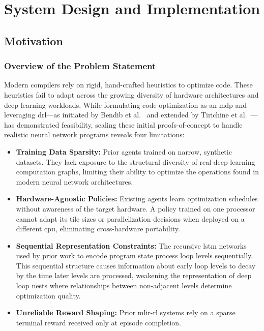 \chapter{System Design and Implementation}
\label{ch:design-implementation}

\section{Motivation}
\label{sec:problem-statement-contributions}

\subsection{Overview of the Problem Statement}
Modern compilers rely on rigid, hand-crafted heuristics to optimize code. These heuristics fail to adapt across the growing diversity of hardware architectures and deep learning workloads. While formulating code optimization as an \gls{mdp} and leveraging \gls{drl}---as initiated by Bendib et al.~\cite{bendib2024reinforcement} and extended by Tirichine et al.~\cite{tirichine2025reinforcement}---has demonstrated feasibility, scaling these initial proofs-of-concept to handle realistic neural network programs reveals four limitations:

\begin{itemize}
    \item \textbf{Training Data Sparsity:} Prior agents trained on narrow, synthetic datasets. They lack exposure to the structural diversity of real deep learning computation graphs, limiting their ability to optimize the operations found in modern neural network architectures.
    \item \textbf{Hardware-Agnostic Policies:} Existing agents learn optimization schedules without awareness of the target hardware. A policy trained on one processor cannot adapt its tile sizes or parallelization decisions when deployed on a different \gls{cpu}, eliminating cross-hardware portability.
    \item \textbf{Sequential Representation Constraints:} The recursive \gls{lstm} networks used by prior work to encode program state process loop levels sequentially. This sequential structure causes information about early loop levels to decay by the time later levels are processed, weakening the representation of deep loop nests where relationships between non-adjacent levels determine optimization quality.
    \item \textbf{Unreliable Reward Shaping:} Prior \gls{mlir}-\gls{rl} systems rely on a sparse terminal reward received only at episode completion.
\end{itemize}

